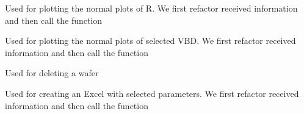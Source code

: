 \documentclass[letterpaper,10pt,english]{sphinxmanual}
\begin{document}

\begin{fulllineitems}
\label{\detokenize{app:app.R_normal}}
\pysigstartsignatures
{}
\pysigstopsignatures
\sphinxAtStartPar
Used for plotting the normal plots of R.
We first refactor received information and then call the function

\end{fulllineitems}


\begin{fulllineitems}
\label{\detokenize{app:app.VBD_normal}}
\pysigstartsignatures
{}
\pysigstopsignatures
\sphinxAtStartPar
Used for plotting the normal plots of selected VBD.
We first refactor received information and then call the function

\end{fulllineitems}


\begin{fulllineitems}
\label{\detokenize{app:app.delete_wafer}}
\pysigstartsignatures
{}
\pysigstopsignatures
\sphinxAtStartPar
Used for deleting a wafer

\end{fulllineitems}


\begin{fulllineitems}
\label{\detokenize{app:app.excel_structure_route}}
\pysigstartsignatures
{}
\pysigstopsignatures
\sphinxAtStartPar
Used for creating an Excel with selected parameters. We first refactor received information and then call the function

\end{fulllineitems}
\end{document}
